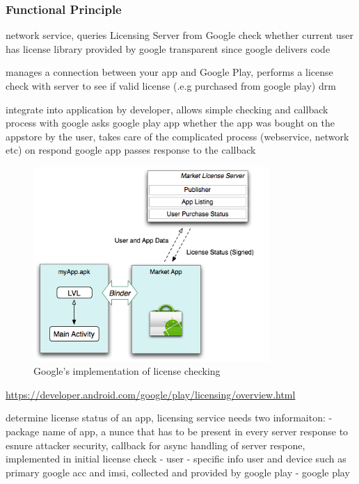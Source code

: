 \subsubsection{Functional Principle} \label{section:license-google-functional}
network service, queries Licensing Server from Google
check whether current user has license
library provided by google
transparent since google delivers code \cite{munteanLicense}

manages a connection between your app and Google Play, performs a license check with server to see if valid license (.e.g purchased from google play)
\gls{drm} \cite{digipomLvl}

integrate into application by developer, allows simple checking and callback process with google
asks google play app whether the app was bought on the appstore by the user, takes care of the complicated process (webservice, network etc)
on respond google app passes response to the callback
\begin{figure}[h]
    \centering
    \includegraphics[width=0.8\textwidth]{data/lvl.png}
    \caption{Google's implementation of license checking \cite{developersLicensingOverview}}
    \label{fig:lvl}
\end{figure}



 \url{https://developer.android.com/google/play/licensing/overview.html}



determine license status of an app, licensing service needs two informaiton:
- package name of app, a nunce that has to be present in every server response to esnure attacker security, callback for async handling of server respone, implemented in initial license check - user
- specific info user and device such as primary google acc and imsi, collected and provided by google play - google play

